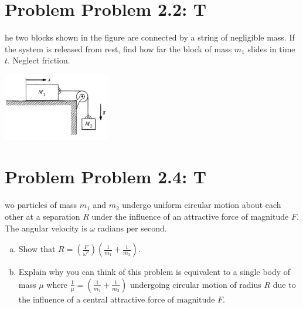 \documentclass[problems]{esg8012pset}
\date{September 17}
\begin{document}
\section*{Problem Problem 2.2: T}
he two blocks shown in the figure are connected by a string of negligible mass. If the system is released from rest, find how far the block of mass $m_1$ slides in time $t$. Neglect friction.
  \begin{center}\includegraphics[width=0.35\textwidth]{ps02_1}\end{center}
\section*{Problem Problem 2.4: T}
wo particles of mass $m_1$ and $m_2$ undergo uniform circular motion about each other at a separation $R$ under the influence of an attractive force of magnitude $F$.  The angular velocity is $\omega$ radians per second.
  \begin{enumerate}[a)]
    \item Show that $R = \left(\frac{F}{\omega^2}\right)\left(\frac{1}{m_1} + \frac{1}{m_2}\right)$.
    \item Explain why you can think of this problem is equivalent to a single body of mass $\mu$ where $\frac{1}{\mu} = \left(\frac{1}{m_1} + \frac{1}{m_2}\right)$ undergoing circular motion of radius $R$ due to the influence of a central attractive force of magnitude $F$.
  \end{enumerate}
\end{document}
